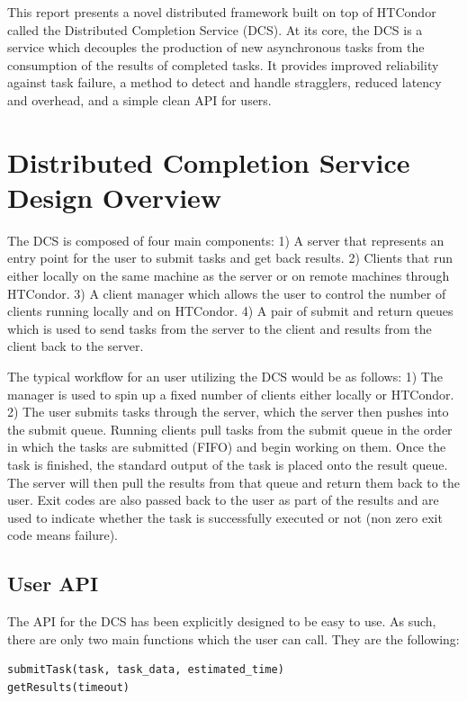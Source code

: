 \documentclass{article}
\begin{document}
This report presents a novel distributed framework built on top of HTCondor called the Distributed Completion Service (DCS). At its core, the DCS is a service which decouples the production of new asynchronous tasks from the consumption of the results of completed tasks. It provides improved reliability against task failure, a method to detect and handle stragglers, reduced latency and overhead, and a simple clean API for users.

\section{Distributed Completion Service Design Overview}

The DCS is composed of four main components: 1) A server that represents an entry point for the user to submit tasks and get back results. 2) Clients that run either locally on the same machine as the server or on remote machines through HTCondor. 3) A client manager which allows the user to control the number of clients running locally and on HTCondor. 4) A pair of submit and return queues which is used to send tasks from the server to the client and results from the client back to the server.

The typical workflow for an user utilizing the DCS would be as follows: 1) The manager is used to spin up a fixed number of clients either locally or HTCondor. 2) The user submits tasks through the server, which the server then pushes into the submit queue. Running clients pull tasks from the submit queue in the order in which the tasks are submitted (FIFO) and begin working on them. Once the task is finished, the standard output of the task is placed onto the result queue. The server will then pull the results from that queue and return them back to the user. Exit codes are also passed back to the user as part of the results and are used to indicate whether the task is successfully executed or not (non zero exit code means failure).

\subsection{User API}

The API for the DCS has been explicitly designed to be easy to use. As such, there are only two main functions which the user can call. They are the following:

\begin{lstlisting}[language=Python]
submitTask(task, task_data, estimated_time)
getResults(timeout)
\end{lstlisting}
\end{document}
